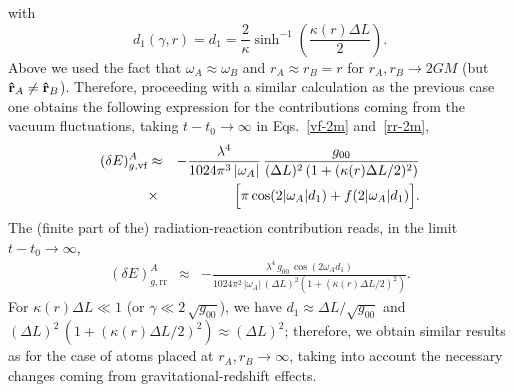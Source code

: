 \documentclass[twocolumn,prd,aps,showpacs,amsmath,amssymb]{revtex4-1}
\def\beq{\begin{equation}}
\def\eeq{\end{equation}}
\def\bea{\begin{eqnarray}}
\def\eea{\end{eqnarray}}
\def\nn{\nonumber}
\begin{document}
with
%
\beq
d_1(\gamma, r) = d_1 = \frac{2}{\kappa} \sinh^{-1}\left(\frac{\kappa(r) \Delta L}{2}\right).
\eeq
%
Above we used the fact that $\omega_{A} \approx \omega_{B}$  and $r_{A} \approx r_{B} = r$ for $r_{A}, r_{B} \to 2GM$ 
(but ${\bf \hat{r}}_A \neq {\bf \hat{r}}_B$). Therefore, proceeding with a similar calculation as the previous case one obtains the following expression for the contributions coming from the vacuum fluctuations, taking $t - t_0 \to \infty$ in Eqs.~\eqref{vf-2m} and~\eqref{rr-2m},
%
\bea
(\delta E)^{A}_{g,\textrm{vf}} &\approx& -\frac{\lambda^4}{1024\pi^3\,|\omega_A|}\,
\frac{g_{00}}{(\Delta L)^2\,(1 + (\kappa(r) \Delta L/2)^2)}
\nn\\
&\times&\,\Bigl[\pi\cos (2 |\omega_A| d_1)  + f(2 |\omega_A| d_1)\Bigr].
\eea
%
The (finite part of the) radiation-reaction contribution reads, in the limit $t - t_0 \to \infty$,
%
\bea
(\delta E)^{A}_{g,\textrm{rr}} &\approx& - \frac{\lambda^4\,g_{00}\,\cos(2\omega _A d_1)}
{1024\pi^2\,|\omega_A|\,(\Delta L)^2(1 + (\kappa(r) \Delta L/2)^2)}.
\label{casimir-rr-2m}
\eea
%
For $\kappa(r) \Delta L \ll 1$ (or $\gamma \ll 2\,\sqrt{g_{00}}$), we have
$d_1 \approx \Delta L/\sqrt{g_{00}}$ and  
 $(\Delta L)^2\,(1 + (\kappa(r) \Delta L/2)^2) \approx (\Delta L)^2$;
 therefore, we obtain similar results as for the case of atoms placed at
 $r_A,r_B\to\infty$, taking into account the necessary changes coming from gravitational-redshift effects. \\ 
 
\end{document}
